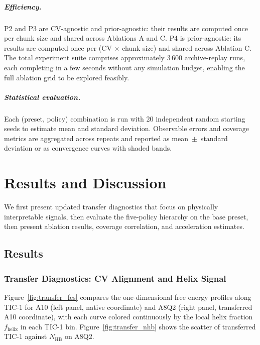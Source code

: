 \paragraph{Efficiency.}
P2 and P3 are CV-agnostic and prior-agnostic: their results are computed once per chunk size and shared across Ablations A and C.
P4 is prior-agnostic: its results are computed once per (CV $\times$ chunk size) and shared across Ablation C.
The total experiment suite comprises approximately 3\,600 archive-replay runs, each completing in a few seconds without any simulation budget, enabling the full ablation grid to be explored feasibly.

\paragraph{Statistical evaluation.}
Each (preset, policy) combination is run with 20 independent random starting seeds to estimate mean and standard deviation.
Observable errors and coverage metrics are aggregated across repeats and reported as mean~$\pm$~standard deviation or as convergence curves with shaded bands.

\chapter{Results and Discussion}\label{chap:results}

\noindent We first present updated transfer diagnostics that focus on physically interpretable signals, then evaluate the five-policy hierarchy on the base preset, then present ablation results, coverage correlation, and acceleration estimates.

\section{Results}

\subsection{Transfer Diagnostics: CV Alignment and Helix Signal}
\label{sec:results_transfer}

Figure~\ref{fig:transfer_fes} compares the one-dimensional free energy profiles along TIC-1 for A10 (left panel, native coordinate) and A8Q2 (right panel, transferred A10 coordinate), with each curve colored continuously by the local helix fraction $f_\mathrm{helix}$ in each TIC-1 bin.
Figure~\ref{fig:transfer_nhb} shows the scatter of transferred TIC-1 against $N_{\mathrm{HB}}$ on A8Q2.

